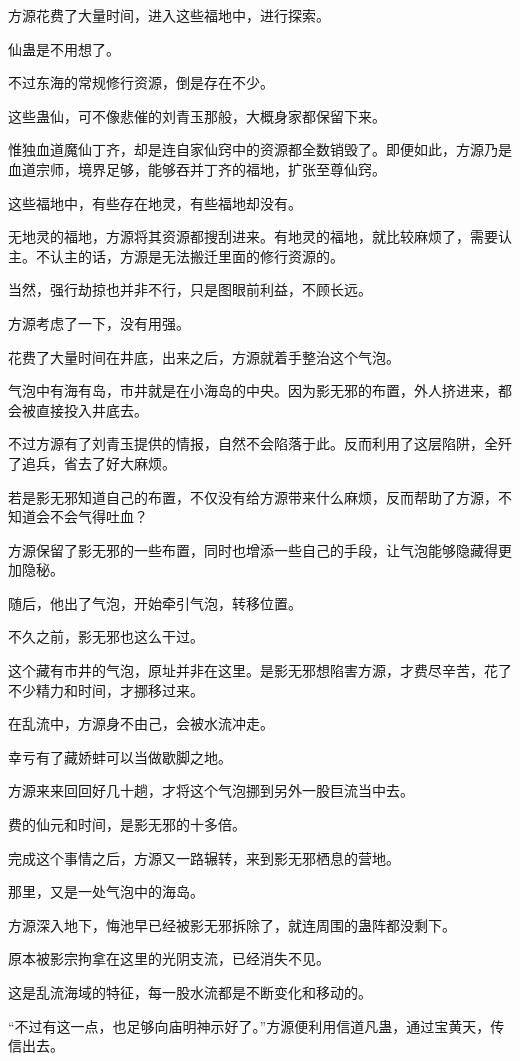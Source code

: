 \begin{this_body}
方源花费了大量时间，进入这些福地中，进行探索。

仙蛊是不用想了。

不过东海的常规修行资源，倒是存在不少。

这些蛊仙，可不像悲催的刘青玉那般，大概身家都保留下来。

惟独血道魔仙丁齐，却是连自家仙窍中的资源都全数销毁了。即便如此，方源乃是血道宗师，境界足够，能够吞并丁齐的福地，扩张至尊仙窍。

这些福地中，有些存在地灵，有些福地却没有。

无地灵的福地，方源将其资源都搜刮进来。有地灵的福地，就比较麻烦了，需要认主。不认主的话，方源是无法搬迁里面的修行资源的。

当然，强行劫掠也并非不行，只是图眼前利益，不顾长远。

方源考虑了一下，没有用强。

花费了大量时间在井底，出来之后，方源就着手整治这个气泡。

气泡中有海有岛，市井就是在小海岛的中央。因为影无邪的布置，外人挤进来，都会被直接投入井底去。

不过方源有了刘青玉提供的情报，自然不会陷落于此。反而利用了这层陷阱，全歼了追兵，省去了好大麻烦。

若是影无邪知道自己的布置，不仅没有给方源带来什么麻烦，反而帮助了方源，不知道会不会气得吐血？

方源保留了影无邪的一些布置，同时也增添一些自己的手段，让气泡能够隐藏得更加隐秘。

随后，他出了气泡，开始牵引气泡，转移位置。

不久之前，影无邪也这么干过。

这个藏有市井的气泡，原址并非在这里。是影无邪想陷害方源，才费尽辛苦，花了不少精力和时间，才挪移过来。

在乱流中，方源身不由己，会被水流冲走。

幸亏有了藏娇蚌可以当做歇脚之地。

方源来来回回好几十趟，才将这个气泡挪到另外一股巨流当中去。

费的仙元和时间，是影无邪的十多倍。

完成这个事情之后，方源又一路辗转，来到影无邪栖息的营地。

那里，又是一处气泡中的海岛。

方源深入地下，悔池早已经被影无邪拆除了，就连周围的蛊阵都没剩下。

原本被影宗拘拿在这里的光阴支流，已经消失不见。

这是乱流海域的特征，每一股水流都是不断变化和移动的。

“不过有这一点，也足够向庙明神示好了。”方源便利用信道凡蛊，通过宝黄天，传信出去。

\end{this_body}

